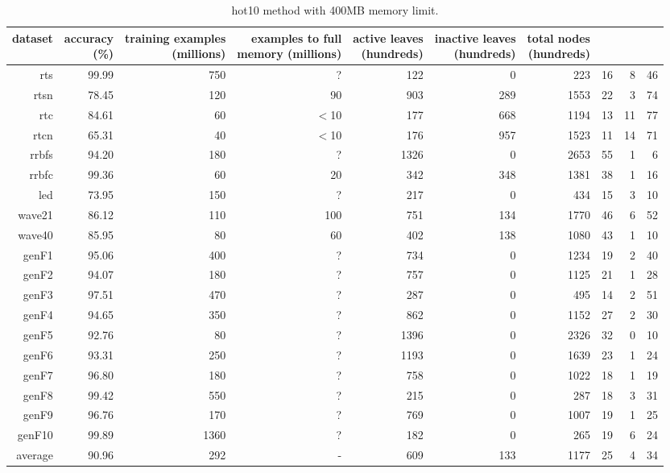 \clearpage
\begin{table}
\caption{{\sc hot10} method with 400MB memory limit.}
\label{tab:hot10-400MB}
\centering
\begin{tabular}{|r|r|r|r|r|r|r|r|r|r|}
\hline
dataset	&
\rotatebox{90}{\parbox{9em}{accuracy\\(\%)}} &
\rotatebox{90}{\parbox{9em}{training examples\\(millions)}} &
\rotatebox{90}{\parbox{9em}{examples to full\\memory (millions)}} &
\rotatebox{90}{\parbox{9em}{active leaves\\(hundreds)}} &
\rotatebox{90}{\parbox{9em}{inactive leaves\\(hundreds)}} &
\rotatebox{90}{\parbox{9em}{total nodes\\(hundreds)}} &
\rotatebox{90}{\parbox{9em}{tree depth}}	&
\rotatebox{90}{\parbox{9em}{training speed (\%)}} &
\rotatebox{90}{\parbox{9em}{prediction speed (\%)}} \\
\hline
{\sc rts} & 99.99 & 750 & ? & 122 & 0 & 223 & 16 & 8 & 46 \\
{\sc rtsn} & 78.45 & 120 & 90 & 903 & 289 & 1553 & 22 & 3 & 74 \\
{\sc rtc} & 84.61 & 60 & $<$10 & 177 & 668 & 1194 & 13 & 11 & 77 \\
{\sc rtcn} & 65.31 & 40 & $<$10 & 176 & 957 & 1523 & 11 & 14 & 71 \\
{\sc rrbfs} & 94.20 & 180 & ? & 1326 & 0 & 2653 & 55 & 1 & 6 \\
{\sc rrbfc} & 99.36 & 60 & 20 & 342 & 348 & 1381 & 38 & 1 & 16 \\
{\sc led} & 73.95 & 150 & ? & 217 & 0 & 434 & 15 & 3 & 10 \\
{\sc wave21} & 86.12 & 110 & 100 & 751 & 134 & 1770 & 46 & 6 & 52 \\
{\sc wave40} & 85.95 & 80 & 60 & 402 & 138 & 1080 & 43 & 1 & 10 \\
{\sc genF1} & 95.06 & 400 & ? & 734 & 0 & 1234 & 19 & 2 & 40 \\
{\sc genF2} & 94.07 & 180 & ? & 757 & 0 & 1125 & 21 & 1 & 28 \\
{\sc genF3} & 97.51 & 470 & ? & 287 & 0 & 495 & 14 & 2 & 51 \\
{\sc genF4} & 94.65 & 350 & ? & 862 & 0 & 1152 & 27 & 2 & 30 \\
{\sc genF5} & 92.76 & 80 & ? & 1396 & 0 & 2326 & 32 & 0 & 10 \\
{\sc genF6} & 93.31 & 250 & ? & 1193 & 0 & 1639 & 23 & 1 & 24 \\
{\sc genF7} & 96.80 & 180 & ? & 758 & 0 & 1022 & 18 & 1 & 19 \\
{\sc genF8} & 99.42 & 550 & ? & 215 & 0 & 287 & 18 & 3 & 31 \\
{\sc genF9} & 96.76 & 170 & ? & 769 & 0 & 1007 & 19 & 1 & 25 \\
{\sc genF10} & 99.89 & 1360 & ? & 182 & 0 & 265 & 19 & 6 & 24 \\
\hline
average & 90.96 & 292 &  -  & 609 & 133 & 1177 & 25 & 4 & 34 \\
\hline
\end{tabular}
\end{table}
\clearpage
